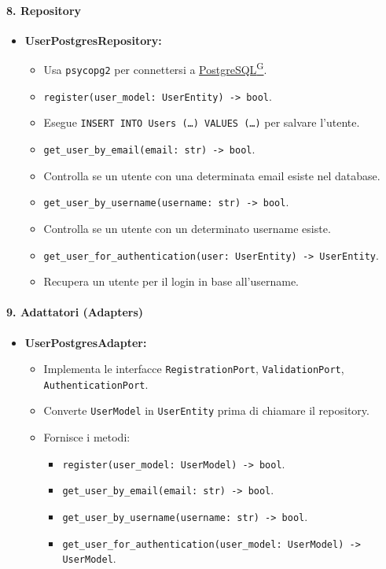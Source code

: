     \paragraph{8. Repository}
    \begin{itemize}
        \item \textbf{UserPostgresRepository:}
        \begin{itemize}
            \item Usa \texttt{psycopg2} per connettersi a \href{https://code7crusaders.github.io/docs/PB/documentazione_interna/glossario.html#postgresql}{PostgreSQL\textsuperscript{G}}.
            \item \texttt{register(user\_model: UserEntity) -> bool}.
            \item Esegue \texttt{INSERT INTO Users (\dots) VALUES (\dots)} per salvare l'utente.
            \item \texttt{get\_user\_by\_email(email: str) -> bool}.
            \item Controlla se un utente con una determinata email esiste nel database.
            \item \texttt{get\_user\_by\_username(username: str) -> bool}.
            \item Controlla se un utente con un determinato username esiste.
            \item \texttt{get\_user\_for\_authentication(user: UserEntity) -> UserEntity}.
            \item Recupera un utente per il login in base all'username.
        \end{itemize}
    \end{itemize}

    \paragraph{9. Adattatori (Adapters)}
    \begin{itemize}
        \item \textbf{UserPostgresAdapter:}
        \begin{itemize}
            \item Implementa le interfacce \texttt{RegistrationPort}, \texttt{ValidationPort}, \texttt{AuthenticationPort}.
            \item Converte \texttt{UserModel} in \texttt{UserEntity} prima di chiamare il repository.
            \item Fornisce i metodi:
            \begin{itemize}
                \item \texttt{register(user\_model: UserModel) -> bool}.
                \item \texttt{get\_user\_by\_email(email: str) -> bool}.
                \item \texttt{get\_user\_by\_username(username: str) -> bool}.
                \item \texttt{get\_user\_for\_authentication(user\_model: UserModel) -> UserModel}.
            \end{itemize}
        \end{itemize}
    \end{itemize}

